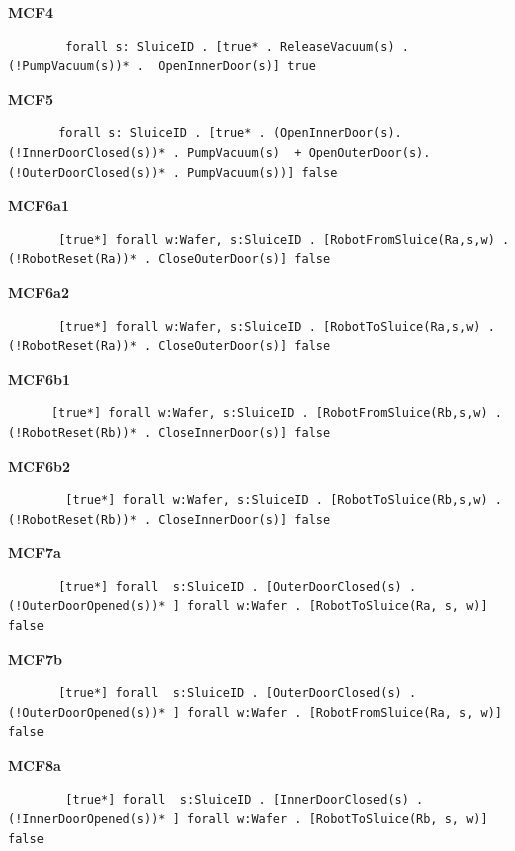 \documentclass[12pt]{report}
\begin{document}
    \textbf{MCF4}
    \begin{lstlisting}
        forall s: SluiceID . [true* . ReleaseVacuum(s) . (!PumpVacuum(s))* .  OpenInnerDoor(s)] true
        \end{lstlisting}

    \textbf{MCF5}
    \begin{lstlisting}
       forall s: SluiceID . [true* . (OpenInnerDoor(s). (!InnerDoorClosed(s))* . PumpVacuum(s)  + OpenOuterDoor(s). (!OuterDoorClosed(s))* . PumpVacuum(s))] false
       \end{lstlisting}

    \textbf{MCF6a1}
    \begin{lstlisting}
       [true*] forall w:Wafer, s:SluiceID . [RobotFromSluice(Ra,s,w) . (!RobotReset(Ra))* . CloseOuterDoor(s)] false
       \end{lstlisting}

    \textbf{MCF6a2}
    \begin{lstlisting}
       [true*] forall w:Wafer, s:SluiceID . [RobotToSluice(Ra,s,w) . (!RobotReset(Ra))* . CloseOuterDoor(s)] false
    \end{lstlisting}
	
    \textbf{MCF6b1}
    \begin{lstlisting}
      [true*] forall w:Wafer, s:SluiceID . [RobotFromSluice(Rb,s,w) . (!RobotReset(Rb))* . CloseInnerDoor(s)] false
    \end{lstlisting}

    \textbf{MCF6b2}
    \begin{lstlisting}
        [true*] forall w:Wafer, s:SluiceID . [RobotToSluice(Rb,s,w) . (!RobotReset(Rb))* . CloseInnerDoor(s)] false
    \end{lstlisting}

    \textbf{MCF7a}
    \begin{lstlisting}
       [true*] forall  s:SluiceID . [OuterDoorClosed(s) . (!OuterDoorOpened(s))* ] forall w:Wafer . [RobotToSluice(Ra, s, w)] false
    \end{lstlisting}

    \textbf{MCF7b}
    \begin{lstlisting}
       [true*] forall  s:SluiceID . [OuterDoorClosed(s) . (!OuterDoorOpened(s))* ] forall w:Wafer . [RobotFromSluice(Ra, s, w)] false
    \end{lstlisting}

    \textbf{MCF8a}
    \begin{lstlisting}
        [true*] forall  s:SluiceID . [InnerDoorClosed(s) . (!InnerDoorOpened(s))* ] forall w:Wafer . [RobotToSluice(Rb, s, w)] false
    \end{lstlisting}
\end{document}
